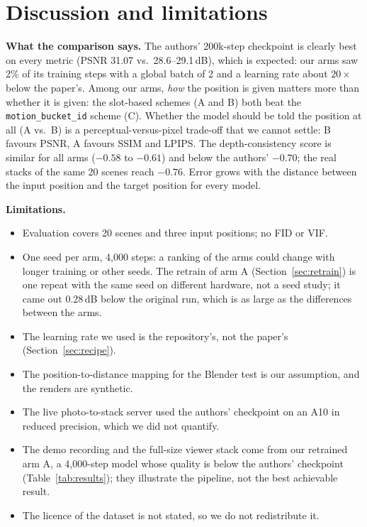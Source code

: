 \documentclass[11pt]{article}
\begin{document}
\section{Discussion and limitations}\label{sec:limits}
\textbf{What the comparison says.} The authors' 200k-step checkpoint is clearly best on every metric (PSNR 31.07 vs.\ 28.6--29.1\,dB), which is expected: our arms saw 2\% of its training steps with a global batch of 2 and a learning rate about $20\times$ below the paper's.
Among our arms, \emph{how} the position is given matters more than whether it is given: the slot-based schemes (A and B) both beat the \texttt{motion\_bucket\_id} scheme (C). Whether the model should be told the position at all (A vs.\ B) is a perceptual-versus-pixel trade-off that we cannot settle: B favours PSNR, A favours SSIM and LPIPS.
The depth-consistency score is similar for all arms ($-0.58$ to $-0.61$) and below the authors' $-0.70$; the real stacks of the same 20 scenes reach $-0.76$. Error grows with the distance between the input position and the target position for every model.

\textbf{Limitations.}
\begin{itemize}[itemsep=1pt]
  \item Evaluation covers 20 scenes and three input positions; no FID or VIF.
  \item One seed per arm, 4{,}000 steps: a ranking of the arms could change with longer training or other seeds. The retrain of arm A (Section~\ref{sec:retrain}) is one repeat with the same seed on different hardware, not a seed study; it came out 0.28\,dB below the original run, which is as large as the differences between the arms.
  \item The learning rate we used is the repository's, not the paper's (Section~\ref{sec:recipe}).
  \item The position-to-distance mapping for the Blender test is our assumption, and the renders are synthetic.
  \item The live photo-to-stack server used the authors' checkpoint on an A10 in reduced precision, which we did not quantify.
    \item The demo recording and the full-size viewer stack come from our retrained arm A, a 4{,}000-step model whose quality is below the authors' checkpoint (Table~\ref{tab:results}); they illustrate the pipeline, not the best achievable result.
  \item The licence of the dataset is not stated, so we do not redistribute it.
\end{itemize}
\end{document}
